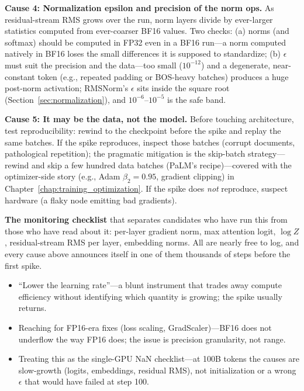 \begin{interviewq}
\textbf{Cause 4: Normalization epsilon and precision of the norm ops.} As residual-stream RMS grows over the run, norm layers divide by ever-larger statistics computed from ever-coarser BF16 values. Two checks: (a) norms (and softmax) should be computed in FP32 even in a BF16 run---a norm computed natively in BF16 loses the small differences it is supposed to standardize; (b) $\epsilon$ must suit the precision and the data---too small ($10^{-12}$) and a degenerate, near-constant token (e.g., repeated padding or BOS-heavy batches) produces a huge post-norm activation; RMSNorm's $\epsilon$ sits inside the square root (Section~\ref{sec:normalization}), and $10^{-6}$--$10^{-5}$ is the safe band.

\textbf{Cause 5: It may be the data, not the model.} Before touching architecture, test reproducibility: rewind to the checkpoint before the spike and replay the same batches. If the spike reproduces, inspect those batches (corrupt documents, pathological repetition); the pragmatic mitigation is the skip-batch strategy---rewind and skip a few hundred data batches (PaLM's recipe)---covered with the optimizer-side story (e.g., Adam $\beta_2 = 0.95$, gradient clipping) in Chapter~\ref{chap:training_optimization}. If the spike does \textit{not} reproduce, suspect hardware (a flaky node emitting bad gradients).

\textbf{The monitoring checklist} that separates candidates who have run this from those who have read about it: per-layer gradient norm, max attention logit, $\log Z$, residual-stream RMS per layer, embedding norms. All are nearly free to log, and every cause above announces itself in one of them thousands of steps before the first spike.

\redflags
\begin{itemize}
    \item ``Lower the learning rate''---a blunt instrument that trades away compute efficiency without identifying which quantity is growing; the spike usually returns.
    \item Reaching for FP16-era fixes (loss scaling, GradScaler)---BF16 does not underflow the way FP16 does; the issue is precision granularity, not range.
    \item Treating this as the single-GPU NaN checklist---at 100B tokens the causes are slow-growth (logits, embeddings, residual RMS), not initialization or a wrong $\epsilon$ that would have failed at step 100.
\end{itemize}


\end{interviewq}
